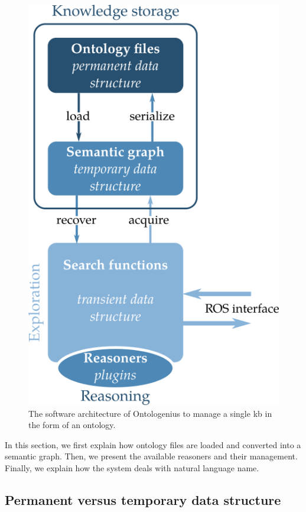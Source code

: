 \begin{figure}[ht!]
\centering
\includegraphics[scale=0.5]{figures/chapter2/archi_single.png}
\caption{\label{fig:chap2_archi_single} The software architecture of Ontologenius to manage a single \acrlong{kb} in the form of an ontology.}
\end{figure}

In this section, we first explain how ontology files are loaded and converted into a semantic graph. Then, we present the available reasoners and their management. Finally, we explain how the system deals with natural language name.

\subsection{Permanent versus temporary data structure}

